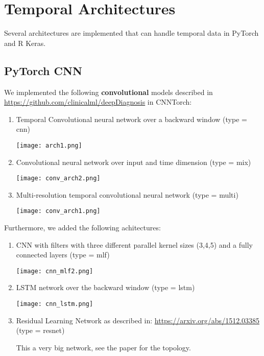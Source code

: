 \documentclass[]{article}
\begin{document}
\section{Temporal Architectures}\label{temporal-architectures}

Several architectures are implemented that can handle temporal data in
PyTorch and R Keras.

\subsection{PyTorch CNN}\label{pytorch-cnn}

We implemented the following \textbf{convolutional} models described in
\url{https://github.com/clinicalml/deepDiagnosis} in CNNTorch:

\begin{enumerate}
\def\labelenumi{\arabic{enumi})}
\item
  Temporal Convolutional neural network over a backward window (type =
  cnn)

  \texttt{[image: arch1.png]}
\item
  Convolutional neural network over input and time dimension (type =
  mix)

  \texttt{[image: conv\_arch2.png]}
\item
  Multi-resolution temporal convolutional neural network (type = multi)

  \texttt{[image: conv\_arch1.png]}
\end{enumerate}

Furthermore, we added the following achitectures:

\begin{enumerate}
\def\labelenumi{\arabic{enumi})}
\setcounter{enumi}{3}
\item
  CNN with filters with three different parallel kernel sizes (3,4,5)
  and a fully connected layers (type = mlf)

  \texttt{[image: cnn\_mlf2.png]}
\item
  LSTM network over the backward window (type = lstm)

  \texttt{[image: cnn\_lstm.png]}
\item
  Residual Learning Network as described in:
  \url{https://arxiv.org/abs/1512.03385} (type = resnet)

  This a very big network, see the paper for the topology.
\end{enumerate}
\end{document}
